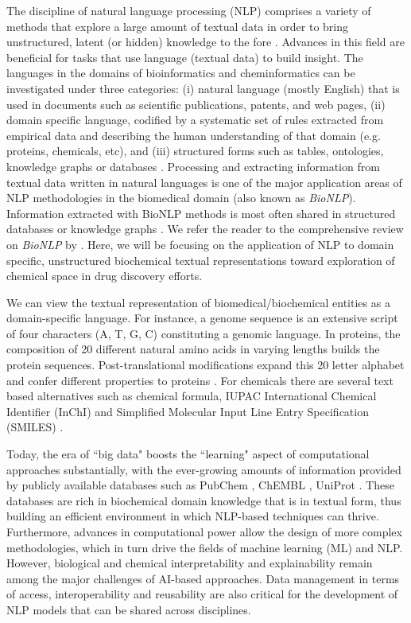 \documentclass[review]{elsarticle}
\begin{document}
The discipline of natural language processing (NLP) comprises a variety of methods that explore a large amount of textual data in order to bring unstructured, latent (or hidden) knowledge to the fore \cite{manning1999foundations}. Advances in this field are beneficial for tasks that use language (textual data) to build insight. The languages in the domains of bioinformatics and cheminformatics can be investigated under three categories: (i) natural language (mostly English) that is used in documents such as scientific publications, patents, and web pages,  (ii) domain specific language, codified by a systematic set of rules extracted from empirical data and describing the human understanding of that domain (e.g. proteins, chemicals, etc), and (iii) structured forms such as tables, ontologies, knowledge graphs or databases \cite{oliveira2019leveraging}. Processing and extracting information from textual data written in natural languages is one of the major application areas of NLP methodologies in the biomedical domain (also known as \textit{BioNLP}). Information extracted with BioNLP methods is most often shared in structured databases or knowledge graphs \cite{ernst2015knowlife}. We refer the reader to the comprehensive review on \textit{BioNLP} by \citet{krallinger2017information}. Here, we will be focusing on the application of NLP to domain specific, unstructured biochemical textual representations toward exploration of chemical space in drug discovery efforts. 

We can view the textual representation of biomedical/biochemical entities as a domain-specific language. For instance, a genome sequence is an extensive script of four characters (A, T, G, C) constituting a genomic language. In proteins, the composition of 20 different natural amino acids in varying lengths builds the protein sequences. Post-translational modifications expand this 20 letter alphabet and confer different properties to proteins \cite{karve2011small}. For chemicals there are several text based alternatives such as chemical formula, IUPAC International Chemical Identifier (InChI)  \cite{heller2013inchi} and Simplified Molecular Input Line Entry Specification  (SMILES) \cite{weininger1988smiles}. 

Today, the era of ``big data" boosts the ``learning" aspect of computational approaches substantially, with the ever-growing amounts of information provided by publicly available databases such as PubChem \cite{bolton2008pubchem}, ChEMBL \cite{gaulton2011chembl}, UniProt \cite{apweiler2004uniprot}. These databases are rich in biochemical domain knowledge that is in textual form, thus building an efficient environment in which NLP-based techniques can thrive. Furthermore, advances in computational power allow the design of more complex methodologies, which in turn drive the fields of machine learning (ML) and NLP. However, biological and chemical interpretability and explainability  remain  among the major challenges of AI-based approaches. Data management in terms of access, interoperability and reusability are also critical for the development of NLP models that can be shared across disciplines.
\end{document}
